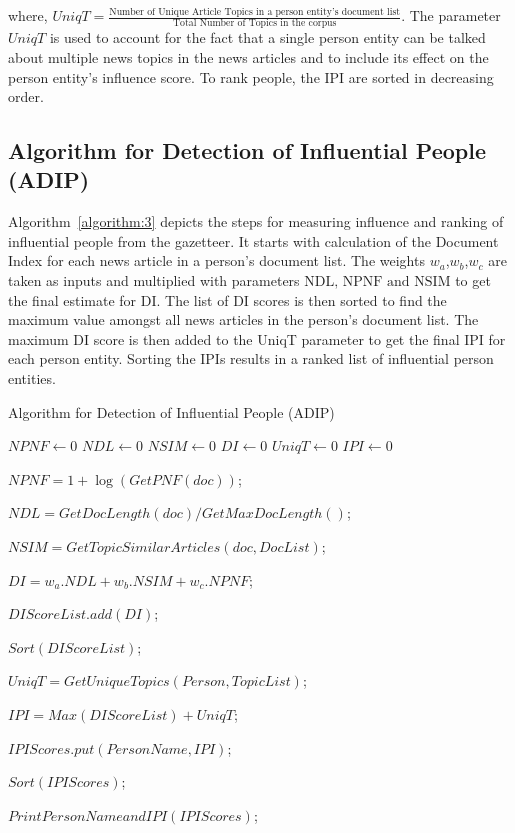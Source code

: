 where, $UniqT = \frac{\text{Number of Unique Article Topics in a person entity's document list}}{\text{Total Number of Topics in the corpus}}$. The parameter $UniqT$  is used to account for the fact that a single person entity can be talked about multiple news topics in the news articles and to include its effect on the person entity's influence score. %
To rank people, the IPI are sorted in decreasing order. %
  
\subsection{Algorithm for Detection of Influential People (ADIP)}

Algorithm~\ref{algorithm:3} depicts the steps for measuring influence and ranking of influential people from the gazetteer. It starts with calculation of the Document Index for each news article in a person's document list. The weights $w_a$,$w_b$,$w_c$ are taken as inputs and multiplied with parameters $\text{NDL, NPNF and NSIM}$  to get the final estimate for DI. The list of DI scores is then sorted to find the maximum value amongst all news articles in the person's document list. The maximum DI score is then added to the UniqT parameter to get the final IPI for each person entity. Sorting the IPIs results in a ranked list of influential person entities.  


\begin{algorithm*}[!th]
\caption{Algorithm for Detection of Influential People (ADIP)}
\label{algorithm:3}
\begin{algorithmic}
  

 $NPNF \leftarrow $0
 $NDL \leftarrow $0
 $NSIM \leftarrow $0
 $DI\leftarrow $0
 $UniqT\leftarrow $0
 $IPI\leftarrow $0\;  
  
     {
	{	
		$NPNF=1+\log (GetPNF(doc))$;
		
$NDL=GetDocLength(doc)/GetMaxDocLength()$;

		$ NSIM=GetTopicSimilarArticles(doc,DocList)$;

		$DI=w_a . NDL+w_b . NSIM+ w_c . NPNF$;
		
		$DIScoreList.add(DI)$;
 	 }
		$Sort(DIScoreList)$;

		$UniqT=GetUniqueTopics(Person,TopicList)$;

		$IPI=Max(DIScoreList)+UniqT$;

		$IPIScores.put(PersonName,IPI)$;
       }
	$Sort(IPIScores)$;

	$PrintPersonNameandIPI(IPIScores)$;

\EndFunction
\end{algorithmic}
\end{algorithm*}

